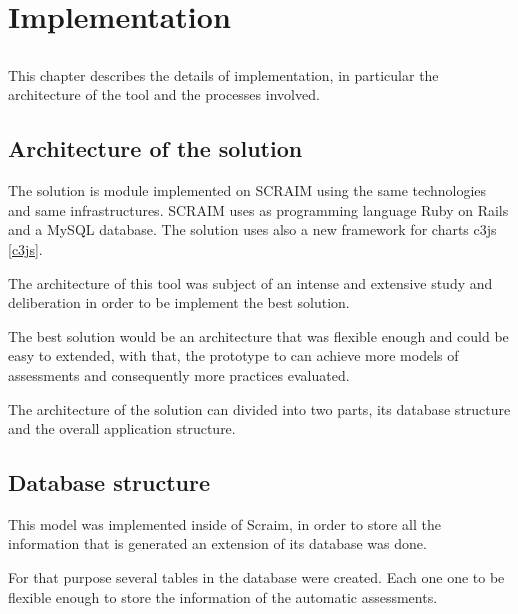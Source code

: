 \chapter{Implementation} \label{chap:implementation}

\section*{}

This chapter describes the details of implementation, in particular the architecture of the tool and the processes involved.

\section{Architecture of the solution} \label{sec:evaluation}

The solution is module implemented on SCRAIM using the same technologies and same infrastructures. SCRAIM uses as programming language Ruby on Rails \citep{hansson2009ruby} and a MySQL \citep{MySql} database. The solution uses also a new framework for charts c3js \ref{c3js}.

The architecture of this tool was subject of an intense and extensive study and deliberation in order to be implement the best solution.

The best solution would be an architecture that was flexible enough and could be easy to extended, with that, the prototype to can achieve more models of assessments and consequently more practices evaluated.

The architecture of the solution can divided into two parts, its database structure and the overall application structure.



\section{Database structure}\label{database}

This model was implemented inside of Scraim, in order to store all the information that is generated an extension of its database was done.

For that purpose several tables in the database were created. Each one one to be flexible enough to store the information of the automatic assessments.

